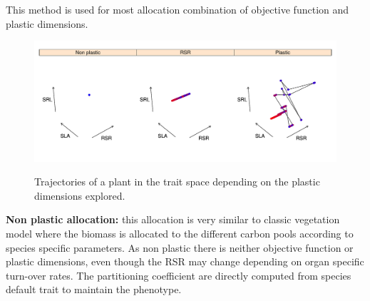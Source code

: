 \documentclass[a4paper,twoside, justified,marginals=raggedright, nobib]{tufte-handout}
\begin{document}
This method is used for most allocation combination of objective function and plastic dimensions.

\begin{figure}
\includegraphics{./Figures/strategy_space_algo.pdf}
\label{fig:traj}
\caption{Trajectories of a plant in the trait space depending on the plastic dimensions explored.}
\end{figure}

\textbf{Non plastic allocation:} this allocation is very similar to classic vegetation model where the biomass is allocated to the different carbon pools according to species specific parameters. As non plastic there is neither objective function or plastic dimensions, even though the RSR may change depending on organ specific turn-over rates. The partitioning coefficient are directly computed from species default trait to maintain the phenotype.\\
\end{document}
